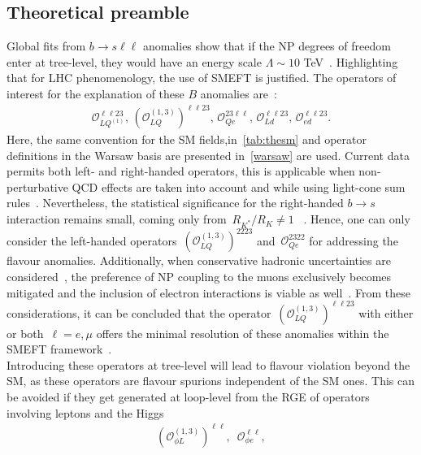 \subsection{Theoretical preamble}
Global fits from $ b \to s \ell \ell$ anomalies show that if the NP degrees of freedom enter at tree-level, they would have an energy scale $ \Lambda \sim 10$ TeV~\cite{DAmico:2017mtc,Geng:2017svp,Capdevila:2017bsm,Ciuchini:2017mik,Hiller:2017bzc}. Highlighting that for LHC phenomenology, the use of SMEFT is justified.  The operators of interest for the explanation of these $B$ anomalies are~\cite{Celis:2017doq,Ciuchini:2019usw,Aebischer:2019mlg}: 
\begin{eqnarray}
	\label{eq:tree_LUV_SMEFT}
	\mathcal{O}_{LQ^{(1)}}^{\ell \ell 23}, \,	(\mathcal{O}_{LQ}^{(1,3)})^{\ell \ell 23}, \, \mathcal{O}_{Qe}^{23 \ell \ell}, \,  \mathcal{O}_{Ld}^{ \ell \ell 23}, \, \mathcal{O}_{ed}^{\ell \ell 23 }.
\end{eqnarray}
Here, the same convention for the SM fields,in~\autoref{tab:thesm} and operator definitions in the Warsaw basis are presented in~\autoref{warsaw} are used.  Current data permits  both left- and right-handed operators, this is applicable when non-perturbative QCD effects are taken into account and while using light-cone sum rules~\cite{Ciuchini:2019usw,Alok:2019ufo,Alguero:2019ptt,Kowalska:2019ley}. Nevertheless, the statistical significance for the right-handed $b \to s$ interaction remains small, coming only from~$R_{K^{*}}/R_{K} \neq 1$ ~\cite{Hiller:2017bzc,Ciuchini:2019usw}. Hence, one can only consider the left-handed operators~$(	\mathcal{O}_{LQ}^{(1,3)} )^{22 23}$ and~$\mathcal{O}_{Qe}^{23 22}$ for addressing the flavour anomalies. Additionally, when conservative hadronic uncertainties are considered~\cite{Jager:2014rwa,Ciuchini:2015qxb,Arbey:2018ics}, the preference of NP coupling to the muons exclusively becomes mitigated and the inclusion of electron interactions is viable as well~\cite{Ciuchini:2017mik}. From these considerations, it can be concluded that the operator~$(\mathcal{O}_{LQ}^{(1,3)} )^{\ell \ell 23}$ with either or both~$ \ell=e, \mu$  offers the minimal resolution of these anomalies within the SMEFT framework~\cite{Ciuchini:2019usw}.\\
Introducing these operators at tree-level will lead to flavour violation beyond the SM, as these operators are flavour spurions independent of the SM ones. This can be avoided if they get generated at loop-level from the RGE of operators involving leptons and the Higgs~\cite{Celis:2017doq} 
\begin{eqnarray} 
	\label{eq:SMEFT_op_HL}
	(	\mathcal{O}_{\phi L}^{(1,3)})^{\ell \ell},	\,\,\, 	\mathcal{O}_{\phi e}^{\ell \ell},
\end{eqnarray}
